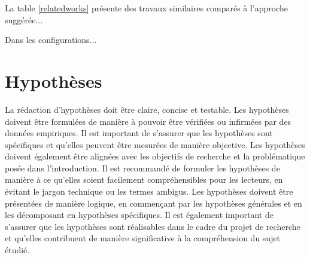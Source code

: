 La table \ref{relatedworks} présente des travaux similaires comparés à l'approche suggérée...

\sloppy
\begin{table}[!htbp]
\centering
\caption{Un titre de tableau}
\label{relatedworks}
\large %
\renewcommand{\arraystretch}{1.7} %
\end{table}
\fussy

Dans les configurations...


\section{Hypothèses}
La rédaction d'hypothèses doit être claire, concise et testable. Les hypothèses doivent être formulées de manière à pouvoir être vérifiées ou infirmées par des données empiriques. Il est important de s'assurer que les hypothèses sont spécifiques et qu'elles peuvent être mesurées de manière objective. Les hypothèses doivent également être alignées avec les objectifs de recherche et la problématique posée dans l'introduction. Il est recommandé de formuler les hypothèses de manière à ce qu'elles soient facilement compréhensibles pour les lecteurs, en évitant le jargon technique ou les termes ambigus. Les hypothèses doivent être présentées de manière logique, en commençant par les hypothèses générales et en les décomposant en hypothèses spécifiques. Il est également important de s'assurer que les hypothèses sont réalisables dans le cadre du projet de recherche et qu'elles contribuent de manière significative à la compréhension du sujet étudié. 

